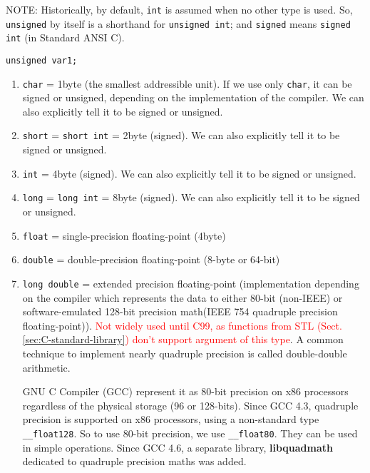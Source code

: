 NOTE: Historically, by default, \verb!int! is assumed when no other type is
used. So, \verb!unsigned! by itself is a shorthand for \verb!unsigned int!; and
\verb!signed! means \verb!signed int! (in Standard ANSI C).
\begin{verbatim}
unsigned var1;
\end{verbatim}
\begin{enumerate}
  \item \verb!char! = 1byte (the smallest addressible unit). If we use only
  \verb!char!, it can be signed or unsigned, depending on the implementation of
  the compiler. We can also explicitly tell it to be signed or unsigned.
  \item \verb!short! = \verb!short int! = 2byte (signed). We can also explicitly
  tell it to be signed or unsigned.
  
  \item \verb!int! = 4byte (signed). We can also explicitly tell it to be signed
  or unsigned.
  
  \item \verb!long! = \verb!long int! = 8byte (signed). We can also explicitly
  tell it to be signed or unsigned. 

  \item \verb!float! = single-precision floating-point (4byte)
  
  \item \verb!double! = double-precision floating-point (8-byte or 64-bit)
  
  \item \verb!long double! = extended precision floating-point (implementation
  depending on the compiler which represents the data to  either 80-bit
  (non-IEEE) or software-emulated 128-bit precision math(IEEE 754 quadruple
  precision floating-point)). \textcolor{red}{Not widely used until C99, as
  functions from STL (Sect.\ref{sec:C-standard-library}) don't support argument of this
  type}.
  A common technique to implement nearly quadruple precision is called double-double arithmetic.
  
  GNU C Compiler (GCC) represent it as 80-bit precision on x86 processors
  regardless of the physical storage (96 or 128-bits). Since GCC 4.3, quadruple precision
  is supported on x86 processors, using a non-standard type \verb!__float128!.
  So to use 80-bit precision, we use \verb!__float80!. They can be used in
  simple operations. Since GCC 4.6, a separate library, {\bf libquadmath}
  dedicated to quadruple precision maths was added.
  

\end{enumerate}
